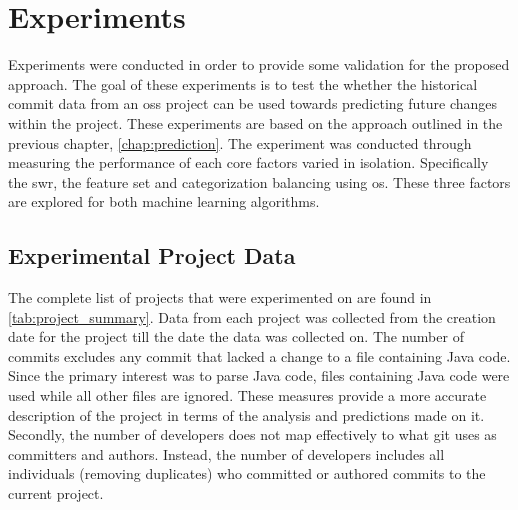 \chapter{Experiments}
\label{chap:experiments}

Experiments were conducted in order to provide some validation for the proposed approach. The goal of these experiments is to test the whether the historical commit data from an \gls{oss} project can be used towards predicting future changes within the project. These experiments are based on the approach outlined in the previous chapter, \autoref{chap:prediction}. The experiment was conducted through measuring the performance of each core factors varied in isolation. Specifically the \gls{swr}, the feature set and categorization balancing using \gls{os}. These three factors are explored for both machine learning algorithms.

\section{Experimental Project Data}
\label{sec:experimental_project_data}



The complete list of projects that were experimented on are found in \autoref{tab:project_summary}. Data from each project was collected from the creation date for the project till the date the data was collected on. The number of commits excludes any commit that lacked a change to a file containing Java code. Since the primary interest was to parse Java code, files containing Java code were used while all other files are ignored. These measures provide a more accurate description of the project in terms of the analysis and predictions made on it. Secondly, the number of developers does not map effectively to what git uses as committers and authors. Instead, the number of developers includes all individuals (removing duplicates) who committed or authored commits to the current project.

